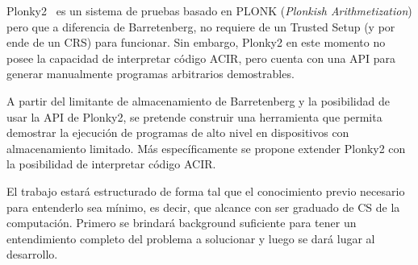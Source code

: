 Plonky2~\cite{PLONKY2} es un sistema de pruebas basado en PLONK (\emph{Plonkish Arithmetization}) pero que a diferencia de Barretenberg, no requiere de un Trusted Setup (y por ende de un CRS) para funcionar. Sin embargo, Plonky2 en este momento no posee la capacidad de interpretar código ACIR, pero cuenta con una API para generar manualmente programas arbitrarios demostrables. 

A partir del limitante de almacenamiento de Barretenberg y la posibilidad de usar la API de Plonky2, se pretende construir una herramienta que permita demostrar la ejecución de programas de alto nivel en dispositivos con almacenamiento limitado. Más específicamente se propone extender Plonky2 con la posibilidad de interpretar código ACIR. 

El trabajo estará estructurado de forma tal que el conocimiento previo necesario para entenderlo sea mínimo, es decir, que alcance con ser graduado de CS de la computación. Primero se brindará background suficiente para tener un entendimiento completo del problema a solucionar y luego se dará lugar al desarrollo. 